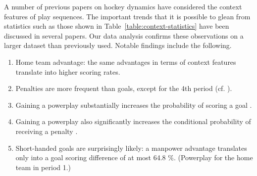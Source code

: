 \documentclass[]{article}
\begin{document}
A number of previous papers on hockey dynamics have considered the context features of play sequences. The important trends that it is possible to glean from statistics such as those shown in Table~\ref{table:context-statistics} have been discussed in several papers. Our data analysis confirms these observations on a larger dataset than previously used. Notable findings include the following.



\begin{enumerate}
\item Home team advantage: the same advantages in terms of context features translate into higher scoring rates.
\item Penalties are more frequent than goals, except for the 4th period (cf. \citep{Schuckers2012}).
\item Gaining a powerplay substantially increases the probability of scoring a goal \citep{Thomas2013}.
\item Gaining a powerplay also significantly increases the conditional probability of receiving a penalty \citep{Schuckers2012}.
\item Short-handed goals are surprisingly likely: a manpower advantage translates only into a goal scoring difference of at most 64.8 \%. (Powerplay for the home team in period 1.)

\end{enumerate}
\end{document}
